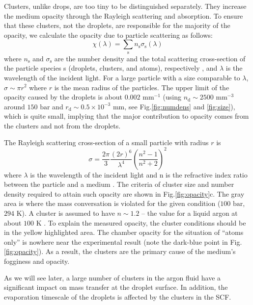 Clusters, unlike drops, are too tiny to be distinguished separately. They increase the medium opacity through the Rayleigh scattering and absorption. To ensure that these clusters, not the droplets, are responsible for the majority of the opacity, we calculate the opacity due to particle scattering as follows:
\begin{equation}
\chi \left( \lambda \right) = \sum_{\text{s}} n_{\text{s}} \sigma_{\text{s}} \left( \lambda \right)
\end{equation}
where $n_\text{s}$ and $\sigma_\text{s}$ are the number density and the total scattering cross-section of the particle species s (droplets, clusters, and atoms), respectively \cite{fivsak2016rayleigh, hulst1981light, howell2020thermal}, and $\lambda$ is the wavelength of the incident light. For a large particle with a size comparable to $\lambda$, $\sigma \sim \pi r^2$ where $r$ is the mean radius of the particles. The upper limit of the opacity caused by the droplets is about $0.002 \text{ mm}^{-1}$ (using $n_\text{d} \sim 2500 \text{ mm}^{-3}$ around $150 \text{ bar}$ and $r_\text{d} \sim 0.5 \times 10^{-3} \text{ mm}$, see Fig.\ref{fig:numdens} and \ref{fig:size}), which is quite small, implying that the major contribution to opacity comes from the clusters and not from the droplets.

The Rayleigh scattering cross-section of a small particle with radius $r$ is
\begin{equation}
\sigma = \frac{2 \pi}{3} \frac{\left( 2 r \right)^{6}}{\lambda^{4}}\left( \frac{n^{2}-1}{n^{2}+2} \right)^{2}
\end{equation}
where $\lambda$ is the wavelength of the incident light and n is the refractive index ratio between the particle and a medium \cite{howell2020thermal}. The criteria of cluster size and number density required to attain such opacity are shown in Fig.\ref{fig:opacity}c. The gray area is  where the mass conversation is violated for the given condition ($100 \text{ bar}$, $294 \text{ K}$). A cluster is assumed to have $n \sim 1.2$ – the value for a liquid argon at about $100 \text{ K}$ \cite{hanna2010equation}. To explain the measured opacity, the cluster conditions should be in the yellow highlighted area. The chamber opacity for the situation of ``atoms only'' is nowhere near the experimental result (note the dark-blue point in Fig.\ref{fig:opacity}). As a result, the clusters are the primary cause of the medium's fogginess and opacity.

As we will see later, a large number of clusters in the argon fluid have a significant impact on mass transfer at the droplet surface. In addition, the evaporation timescale of the droplets is affected by the clusters in the SCF.


